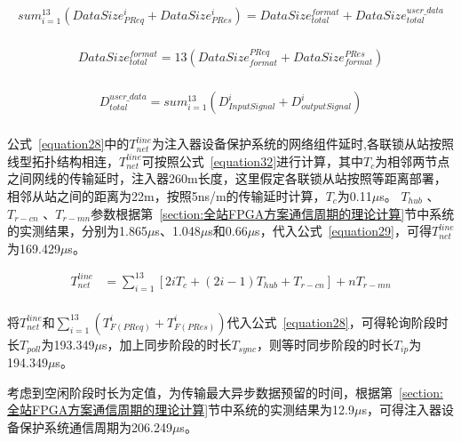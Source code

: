\begin{equation}
\begin{split}
\label{equation29}
sum_{i=1}^{13}(DataSize_{PReq}^{i}+DataSize_{PRes}^{i}) = DataSize_{total}^{format}+DataSize_{total}^{user\_data}\\
\end{split}
\end{equation}


\begin{equation}
\begin{split}
\label{equation30}
DataSize_{total}^{format} = 13(DataSize_{format}^{PReq}+DataSize_{format}^{PRes})\\
\end{split}
\end{equation}


\begin{equation}
\begin{split}
\label{equation31}
D_{total}^{user\_data} = sum_{i=1}^{13}(D_{InputSignal}^{i}+D_{outputSignal}^{i})\\
\end{split}
\end{equation}


公式~\ref{equation28}中的$T_{net}^{line}$为注入器设备保护系统的网络组件延时,各联锁从站按照线型拓扑结构相连，$T_{net}^{line}$可按照公式~\ref{equation32}进行计算，其中$T_{c}$为相邻两节点之间网线的传输延时，注入器260m长度，这里假定各联锁从站按照等距离部署，相邻从站之间的距离为22m，按照5ns/m的传输延时计算，$T_{c}$为0.11$\mu$s。 $T_{hub}$ 、$T_{r-cn}$ 、$T_{r-mn}$参数根据第~\ref{section:全站FPGA方案通信周期的理论计算}节中系统的实测结果，分别为1.865$\mu$s、1.048$\mu$s和0.66$\mu$s，代入公式~\ref{equation29}，可得$T_{net}^{line}$为169.429$\mu$s。

\begin{equation}
\begin{split}
\label{equation32}
T_{net}^{line}&=\sum_{i=1}^{13}[2iT_{c}+(2i-1)T_{hub}+T_{r-cn}]+nT_{r-mn}\\
\end{split}
\end{equation}

将$T_{net}^{line}$和$\sum_{i=1}^{13}(T_{F(PReq)}^{i}+T_{F(PRes)}^{i})$代入公式~\ref{equation28}，可得轮询阶段时长$T_{poll}$为193.349$\mu$s，加上同步阶段的时长$T_{sync}$，则等时同步阶段的时长$T_{ip}$为194.349$\mu$s。

考虑到空闲阶段时长为定值，为传输最大异步数据预留的时间，根据第~\ref{section:全站FPGA方案通信周期的理论计算}节中系统的实测结果为12.9$\mu$s，可得注入器设备保护系统通信周期为206.249$\mu$s。


